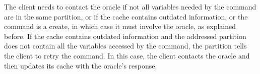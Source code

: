 The client needs to contact the oracle if not all variables needed by the command are in the same partition, or if the cache contains outdated information, or the command is a create, in which case it must involve the oracle, as explained before.
If the cache contains outdated information and the addressed partition does not contain all the variables accessed by the command, the partition tells the client to retry the command.
In this case, the client contacts the oracle and then updates its cache with the oracle's response.






